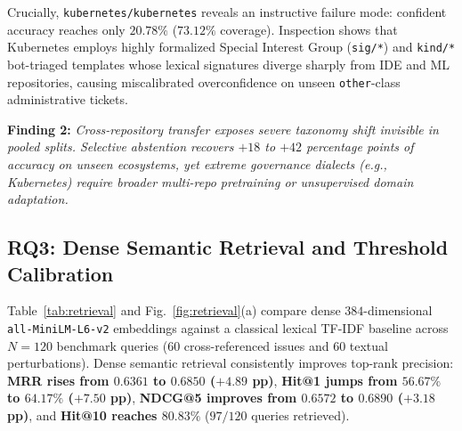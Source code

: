 \documentclass[conference]{IEEEtran}
\begin{document}
Crucially, \texttt{kubernetes/kubernetes} reveals an instructive failure mode: confident accuracy reaches only $20.78\%$ ($73.12\%$ coverage). Inspection shows that Kubernetes employs highly formalized Special Interest Group (\texttt{sig/*}) and \texttt{kind/*} bot-triaged templates whose lexical signatures diverge sharply from IDE and ML repositories, causing miscalibrated overconfidence on unseen \texttt{other}-class administrative tickets.

\textbf{Finding 2:} \emph{Cross-repository transfer exposes severe taxonomy shift invisible in pooled splits. Selective abstention recovers $+18$ to $+42$ percentage points of accuracy on unseen ecosystems, yet extreme governance dialects (e.g., Kubernetes) require broader multi-repo pretraining or unsupervised domain adaptation.}

\subsection{RQ3: Dense Semantic Retrieval and Threshold Calibration}
\label{sec:results_retrieval}

Table~\ref{tab:retrieval} and Fig.~\ref{fig:retrieval}(a) compare dense $384$-dimensional \texttt{all-MiniLM-L6-v2} embeddings against a classical lexical TF-IDF baseline across $N=120$ benchmark queries ($60$ cross-referenced issues and $60$ textual perturbations). Dense semantic retrieval consistently improves top-rank precision: \textbf{MRR rises from $0.6361$ to $0.6850$ ($+4.89$ pp)}, \textbf{Hit@1 jumps from $56.67\%$ to $64.17\%$ ($+7.50$ pp)}, \textbf{NDCG@5 improves from $0.6572$ to $0.6890$ ($+3.18$ pp)}, and \textbf{Hit@10 reaches $80.83\%$} ($97/120$ queries retrieved).
\end{document}
